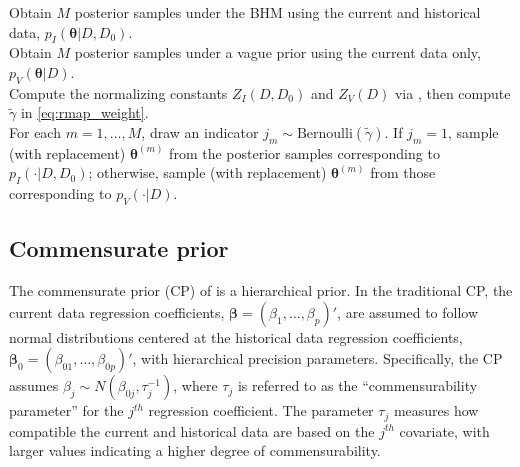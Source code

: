 \begin{algorithm}
  \SetAlgoLined
  Obtain $M$ posterior samples under the BHM using the current and historical data, $p_{I}(\bm{\theta} | D, D_0)$.
  \\ Obtain $M$ posterior samples under a vague prior using the current data only, $p_V(\bm{\theta} | D)$.
  \\ Compute the normalizing constants $Z_I(D, D_0)$ and $Z_V(D)$ via , then compute $\tilde{\gamma}$ in \eqref{eq:rmap_weight}.
  \\ For each $m = 1, \ldots, M$, draw an indicator $j_m \sim \text{Bernoulli}(\tilde{\gamma})$. If $j_m = 1$, sample (with replacement) $\bm{\theta}^{(m)}$ from the posterior samples corresponding to $p_I(\cdot | D, D_0)$; otherwise, sample (with replacement) $\bm{\theta}^{(m)}$ from those corresponding to $p_V(\cdot | D)$.
  \caption{Posterior Sampling under the Robust Meta-Analytic Predictive Prior}
  \label{alg:rmap}
\end{algorithm}

\subsection{Commensurate prior}
\label{sec:cp}

The commensurate prior (CP) of \cite{hobbs2012commensurate} is a hierarchical prior. In the traditional CP, the current data regression coefficients, $\bm{\beta} = (\beta_1, \ldots, \beta_p)'$, are assumed to follow normal distributions centered at the historical data regression coefficients, $\bm{\beta}_0 = (\beta_{01}, \ldots, \beta_{0p})'$, with hierarchical precision parameters. Specifically, the CP assumes $\beta_j \sim N(\beta_{0j}, \tau_j^{-1})$, where $\tau_j$ is referred to as the ``commensurability parameter'' for the $j^{th}$ regression coefficient. The parameter $\tau_j$ measures how compatible the current and historical data are based on the $j^{th}$ covariate, with larger values indicating a higher degree of commensurability.

